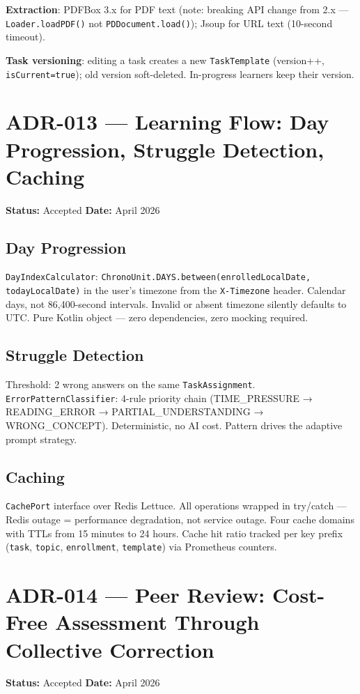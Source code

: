 \textbf{Extraction}: PDFBox 3.x for PDF text (note: breaking API change from 2.x — \texttt{Loader.loadPDF()} not \texttt{PDDocument.load()}); Jsoup for URL text (10-second timeout).

\textbf{Task versioning}: editing a task creates a new \texttt{TaskTemplate} (version++, \texttt{isCurrent=true}); old version soft-deleted. In-progress learners keep their version.

\section{ADR-013 — Learning Flow: Day Progression, Struggle Detection, Caching}
\label{adr:013}
\textbf{Status:} Accepted \quad \textbf{Date:} April 2026

\subsection*{Day Progression}
\texttt{DayIndexCalculator}: \texttt{ChronoUnit.DAYS.between(enrolledLocalDate, todayLocalDate)} in the user's timezone from the \texttt{X-Timezone} header. Calendar days, not 86,400-second intervals. Invalid or absent timezone silently defaults to UTC. Pure Kotlin object — zero dependencies, zero mocking required.

\subsection*{Struggle Detection}
Threshold: 2 wrong answers on the same \texttt{TaskAssignment}. \texttt{ErrorPatternClassifier}: 4-rule priority chain (TIME\_PRESSURE → READING\_ERROR → PARTIAL\_UNDERSTANDING → WRONG\_CONCEPT). Deterministic, no AI cost. Pattern drives the adaptive prompt strategy.

\subsection*{Caching}
\texttt{CachePort} interface over Redis Lettuce. All operations wrapped in try/catch — Redis outage = performance degradation, not service outage. Four cache domains with TTLs from 15 minutes to 24 hours. Cache hit ratio tracked per key prefix (\texttt{task}, \texttt{topic}, \texttt{enrollment}, \texttt{template}) via Prometheus counters.

\section{ADR-014 — Peer Review: Cost-Free Assessment Through Collective Correction}
\label{adr:014}
\textbf{Status:} Accepted \quad \textbf{Date:} April 2026

